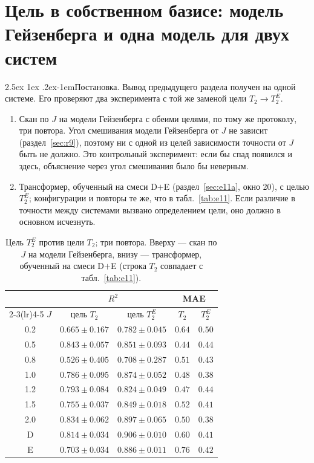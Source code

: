 \documentclass[12pt,a4paper]{report}
\makeatletter
\renewcommand\paragraph{\@startsection{paragraph}{4}{\z@}%
  {2.5ex \@plus1ex \@minus.2ex}{-1em}{\normalfont\normalsize\bfseries}}
\numberwithin{equation}{chapter}
\makeatother
\begin{document}
\section{Цель в собственном базисе: модель Гейзенберга и одна модель для двух систем}
\label{sec:r20}

\paragraph{Постановка.} Вывод предыдущего раздела получен на одной системе.
Его проверяют два эксперимента с той же заменой цели $T_2\to T_2^E$.
\begin{enumerate}
\item Скан по $J$ на модели Гейзенберга с обеими целями, по тому же
      протоколу, три повтора. Угол смешивания модели Гейзенберга от $J$ не
      зависит (раздел~\ref{sec:r9}), поэтому ни с одной из целей
      зависимости точности от $J$ быть не должно. Это контрольный
      эксперимент: если бы спад появился и здесь, объяснение через угол
      смешивания было бы неверным.
\item Трансформер, обученный на смеси D$+$E (раздел~\ref{sec:e11a}, окно
      20), с целью $T_2^E$; конфигурации и повторы те же, что в
      табл.~\ref{tab:e11}. Если различие в точности между системами
      вызвано определением цели, оно должно в основном исчезнуть.
\end{enumerate}

\begin{table}[h]
\centering
\caption{Цель $T_2^E$ против цели $T_2$; три повтора. Вверху --- скан по $J$
на модели Гейзенберга, внизу --- трансформер, обученный на смеси D$+$E
(строка $T_2$ совпадает с табл.~\ref{tab:e11}).}
\label{tab:r20}
\small
\begin{tabular}{@{}ccccc@{}}
\toprule
 & \multicolumn{2}{c}{$R^2$} & \multicolumn{2}{c}{MAE} \\
\cmidrule(lr){2-3}\cmidrule(lr){4-5}
$J$ & цель $T_2$ & цель $T_2^E$ & $T_2$ & $T_2^E$ \\
\midrule
0.2 & $0.665\pm0.167$ & $0.782\pm0.045$ & $0.64$ & $0.50$ \\
0.5 & $0.843\pm0.057$ & $0.851\pm0.093$ & $0.44$ & $0.44$ \\
0.8 & $0.526\pm0.405$ & $0.708\pm0.287$ & $0.51$ & $0.43$ \\
1.0 & $0.786\pm0.095$ & $0.874\pm0.052$ & $0.48$ & $0.38$ \\
1.2 & $0.793\pm0.084$ & $0.824\pm0.049$ & $0.47$ & $0.44$ \\
1.5 & $0.755\pm0.037$ & $0.849\pm0.018$ & $0.52$ & $0.41$ \\
2.0 & $0.834\pm0.062$ & $0.897\pm0.065$ & $0.50$ & $0.38$ \\
\midrule
D & $0.814\pm0.034$ & $0.906\pm0.010$ & $0.60$ & $0.41$ \\
E & $0.703\pm0.034$ & $0.886\pm0.011$ & $0.76$ & $0.42$ \\
\bottomrule
\end{tabular}
\end{table}
\end{document}
